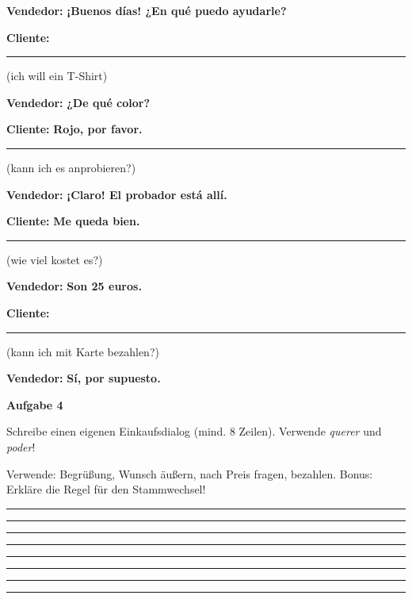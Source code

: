 \documentclass[11pt, a4paper]{article}
\newcommand{\fachfarbe}{spanisch}
\newcommand{\punktebox}[1]{\hfill\fbox{\small \_/#1}}
\newcommand{\luecke}[1]{\rule{#1}{0.4pt}}
\newcommand{\es}[1]{\textcolor{\fachfarbe}{\textbf{#1}}}
\newenvironment{aufgabe}[1]{%
    \needspace{5\baselineskip}%
    \nopagebreak[4]%
    \vspace{10pt}
    \noindent\textbf{\textcolor{\fachfarbe}{Aufgabe #1}}
    \nopagebreak[4]%
    \vspace{5pt}
    \nopagebreak[4]%
    \begin{list}{}{\leftmargin=0pt}
    \item[]
}{%
    \end{list}
}
\begin{document}
\noindent
\textbf{Vendedor:} \es{¡Buenos días! ¿En qué puedo ayudarle?}

\noindent
\textbf{Cliente:} \luecke{8cm} (ich will ein T-Shirt)

\noindent
\textbf{Vendedor:} \es{¿De qué color?}

\noindent
\textbf{Cliente:} \es{Rojo, por favor.} \luecke{5cm} (kann ich es anprobieren?)

\noindent
\textbf{Vendedor:} \es{¡Claro! El probador está allí.}

\noindent
\textbf{Cliente:} \es{Me queda bien.} \luecke{4cm} (wie viel kostet es?)

\noindent
\textbf{Vendedor:} \es{Son 25 euros.}

\noindent
\textbf{Cliente:} \luecke{6cm} (kann ich mit Karte bezahlen?)

\noindent
\textbf{Vendedor:} \es{Sí, por supuesto.}

\vspace{15pt}


\begin{aufgabe}{4}
Schreibe einen eigenen Einkaufsdialog (mind. 8 Zeilen). Verwende \textit{querer} und \textit{poder}! \punktebox{6}
\end{aufgabe}

\begin{hinweis}
Verwende: Begrüßung, Wunsch äußern, nach Preis fragen, bezahlen. Bonus: Erkläre die Regel für den Stammwechsel!
\end{hinweis}

\noindent\rule{\textwidth}{0.4pt}\vspace{8pt}
\noindent\rule{\textwidth}{0.4pt}\vspace{8pt}
\noindent\rule{\textwidth}{0.4pt}\vspace{8pt}
\noindent\rule{\textwidth}{0.4pt}\vspace{8pt}
\noindent\rule{\textwidth}{0.4pt}\vspace{8pt}
\noindent\rule{\textwidth}{0.4pt}\vspace{8pt}
\noindent\rule{\textwidth}{0.4pt}\vspace{8pt}
\noindent\rule{\textwidth}{0.4pt}\vspace{8pt}

\vspace{10pt}
\end{document}
